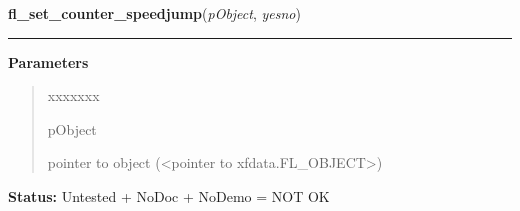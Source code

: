 \hspace{.8\funcindent}\begin{boxedminipage}{\funcwidth}

    \raggedright \textbf{fl\_set\_counter\_speedjump}(\textit{pObject}, \textit{yesno})

    \vspace{-1.5ex}

    \rule{\textwidth}{0.5\fboxrule}
\setlength{\parskip}{2ex}
\setlength{\parskip}{1ex}
      \textbf{Parameters}
      \vspace{-1ex}

      \begin{quote}
        \begin{Ventry}{xxxxxxx}

          \item[pObject]

          pointer to object ({\textless}pointer to 
          xfdata.FL\_OBJECT{\textgreater})

        \end{Ventry}

      \end{quote}

\textbf{Status:} Untested + NoDoc + NoDemo = NOT OK



    \end{boxedminipage}

    \label{xformslib:library:fl_set_cursor}

    \vspace{0.5ex}

